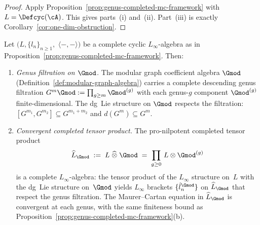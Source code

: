 \begin{proof}
Apply Proposition~\ref{prop:genus-completed-mc-framework} with
$L=\Defcyc(\cA)$.  This gives parts~\textup{(i)} and~\textup{(ii)}.
Part~\textup{(iii)} is exactly
Corollary~\ref{cor:one-dim-obstruction}.
\end{proof}

\begin{proposition}\label{prop:geometric-modular-operadic-mc}
Let\/ $(L, \{l_n\}_{n \geq 1},$\allowbreak
$\langle{-},{-}\rangle)$ be a complete
cyclic $L_\infty$-algebra as in
Proposition~\textup{\ref{prop:genus-completed-mc-framework}}.
Then:
\begin{enumerate}[label=\textup{(\alph*)}]
\item \emph{Genus filtration on $\Gmod$.}
  The modular graph coefficient algebra $\Gmod$
  \textup{(}Definition~\textup{\ref{def:modular-graph-algebra}}\textup{)}
  carries a complete descending genus filtration
  $G^m{\Gmod} := \prod_{g \geq m} {\Gmod}^{(g)}$
  with each genus-$g$ component ${\Gmod}^{(g)}$ finite-dimensional.
  The dg~Lie structure on $\Gmod$ respects the filtration:
  $[G^{m_1}, G^{m_2}] \subseteq G^{m_1+m_2}$ and
  $d(G^m) \subseteq G^m$.

\item \emph{Convergent completed tensor product.}
  The pro-nilpotent completed tensor product
  \begin{equation}\label{eq:completed-tensor-gmod}
  \widehat{L}_{\Gmod}
  \;:=\;
  L \;\widehat{\otimes}\; \Gmod
  \;=\;
  \prod_{g \geq 0}\, L \otimes {\Gmod}^{(g)}
  \end{equation}
  is a complete $L_\infty$-algebra: the tensor product of the
  $L_\infty$ structure on~$L$ with the dg~Lie structure on~$\Gmod$
  yields $L_\infty$ brackets $\{\hat{l}_n^{\Gmod}\}$
  on $\widehat{L}_{\Gmod}$ that respect the genus filtration.
  The Maurer--Cartan equation in $\widehat{L}_{\Gmod}$ is
  convergent at each genus, with the same finiteness bound as
  Proposition~\textup{\ref{prop:genus-completed-mc-framework}(b)}.


\end{enumerate}
\end{proposition}
